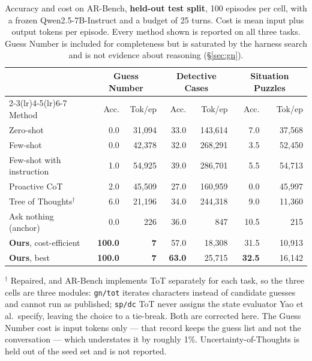 \begin{table}[t]
\centering
\small
\setlength{\tabcolsep}{5pt}
\caption{Accuracy and cost on AR-Bench, \textbf{held-out test split}, 100 episodes per cell, with
a frozen Qwen2.5-7B-Instruct and a budget of 25 turns. Cost is mean input plus output tokens per
episode. Every method shown is reported on all three tasks. Guess Number is included for
completeness but is saturated by the harness search and is not evidence about reasoning
(\S\ref{sec:gn}).}
\label{tab:main}
\begin{tabular}{l rr rr rr}
\toprule
 & \multicolumn{2}{c}{Guess Number} & \multicolumn{2}{c}{Detective Cases}
 & \multicolumn{2}{c}{Situation Puzzles} \\
\cmidrule(lr){2-3}\cmidrule(lr){4-5}\cmidrule(lr){6-7}
Method & Acc. & Tok/ep & Acc. & Tok/ep & Acc. & Tok/ep \\
\midrule
Zero-shot                      &  0.0 & 31,094 & 33.0 & 143,614 &  7.0 & 37,568 \\
Few-shot                       &  0.0 & 42,378 & 32.0 & 268,291 &  3.5 & 52,450 \\
Few-shot with instruction      &  1.0 & 54,925 & 39.0 & 286,701 &  5.5 & 54,713 \\
Proactive CoT                  &  2.0 & 45,509 & 27.0 & 160,959 &  0.0 & 45,997 \\
Tree of Thoughts$^{\dagger}$   &  6.0 & 21,196 & 34.0 & 244,318 &  9.0 & 11,360 \\
\addlinespace[2pt]
Ask nothing (anchor)           &  0.0 &    226 & 36.0 &     847 & 10.5 &    215 \\
\midrule
\textbf{Ours}, cost-efficient  & \textbf{100.0} & \textbf{7} & 57.0 & 18,308 & 31.5 & 10,913 \\
\textbf{Ours}, best            & \textbf{100.0} & \textbf{7} & \textbf{63.0} & 25,715 & \textbf{32.5} & 16,142 \\
\bottomrule
\end{tabular}

\vspace{2pt}
\footnotesize
$^{\dagger}$ Repaired, and AR-Bench implements ToT separately for each task, so the three cells are
three modules: \texttt{gn/tot} iterates characters instead of candidate guesses and cannot run as
published; \texttt{sp/dc} ToT never assigns the state evaluator Yao et al.\ specify, leaving the
choice to a tie-break. Both are corrected here. The Guess Number cost is input tokens only --- that
record keeps the guess list and not the conversation --- which understates it by roughly 1\%.
Uncertainty-of-Thoughts is held out of the seed set and is not reported.


\end{table}
